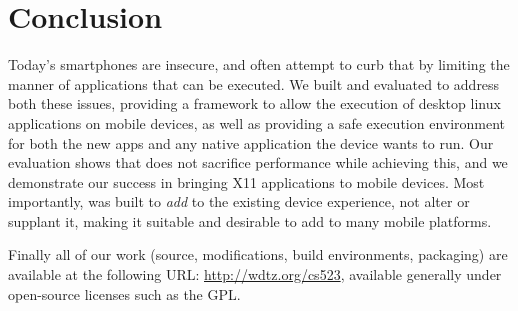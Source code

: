 \section{Conclusion}
\label{sec:conclusion}
Today's smartphones are insecure, and often attempt to curb that by limiting the manner of applications that can be executed.  We built and evaluated \emph{\proj} to address both these issues, providing a framework to allow the execution of desktop linux applications on mobile devices, as well as providing a safe execution environment for both the new apps and any native application the device wants to run.  Our evaluation shows that \emph{\proj} does not sacrifice performance while achieving this, and we demonstrate our success in bringing X11 applications to mobile devices.  Most importantly, \emph{\proj} was built to \emph{add} to the existing device experience, not alter or supplant it, making it suitable and desirable to add to many mobile platforms.

Finally all of our work (source, modifications, build environments, packaging) are available at the following URL: \url{http://wdtz.org/cs523}, available generally under open-source licenses such as the GPL.
